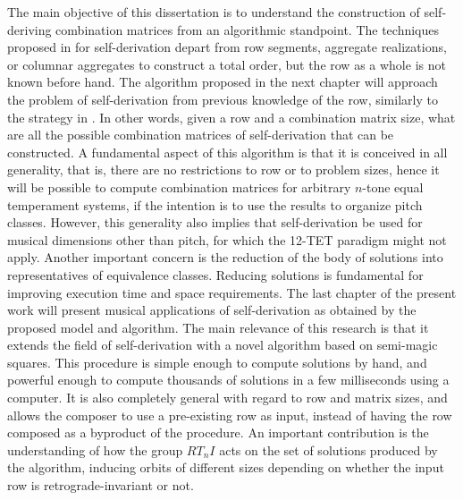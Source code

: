 The main objective of this dissertation is to understand the construction of self-deriving combination matrices from an algorithmic standpoint. The techniques proposed in \cite{Starr1984} for self-derivation depart from row segments, aggregate realizations, or columnar aggregates to construct a total order, but the row as a whole is not known before hand. The algorithm proposed in the next chapter will approach the problem of self-derivation from previous knowledge of the row, similarly to the strategy in \cite{Kowalski1987b}. In other words, given a row and a combination matrix size, what are all the possible combination matrices of self-derivation that can be constructed. A fundamental aspect of this algorithm is that it is conceived in all generality, that is, there are no restrictions to row or to problem sizes, hence it will be possible to compute combination matrices for arbitrary $n$-tone equal temperament systems, if the intention is to use the results to organize pitch classes. However, this generality also implies that self-derivation be used for musical dimensions other than pitch, for which the 12-TET paradigm might not apply. Another important concern is the reduction of the body of solutions into representatives of equivalence classes. Reducing solutions is fundamental for improving execution time and space requirements. The last chapter of the present work will present musical applications of self-derivation as obtained by the proposed model and algorithm. The main relevance of this research is that it extends the field of self-derivation with a novel algorithm based on semi-magic squares. This procedure is simple enough to compute solutions by hand, and powerful enough to compute thousands of solutions in a few milliseconds using a computer. It is also completely general with regard to row and matrix sizes, and allows the composer to use a pre-existing row as input, instead of having the row composed as a byproduct of the procedure. An important contribution is the understanding of how the group $RT_nI$ acts on the set of solutions produced by the algorithm, inducing orbits of different sizes depending on whether the input row is retrograde-invariant or not.

